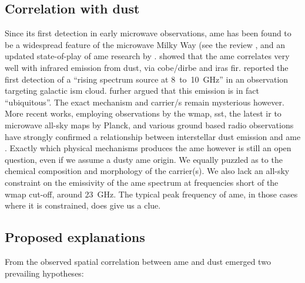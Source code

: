     \subsection{Correlation with dust}
           Since its first detection in early microwave observations, \gls{ame} has been found to be a widespread feature of the microwave Milky Way (see the review \cite{dickinson13r}, and an updated state-of-play of \gls{ame} research by \cite{dickinson18}. \cite{kogut96,deoliveiracosta97} showed that the \gls{ame} correlates very well with infrared emission from dust, via \gls{cobe}/\gls{dirbe} and \gls{iras} \gls{fir}.  \cite{finkbeiner02} reported the first detection of a ``rising spectrum source at 8~to~10~GHz'' in an observation targeting galactic \gls{ism} cloud. \cite{deoliveiracosta02} furher argued that this emission is in fact ``ubiquitous''. The exact mechanism and carrier/s remain mysterious however.
        More recent works, employing observations by the \gls{wmap}, \gls{sst}, the latest \gls{ir} to microwave all-sky maps by Planck, and various ground based radio observations have strongly confirmed a relationship between interstellar dust emission and \gls{ame} \citep{ysard10a,tibbs11,hensley16}. Exactly which physical mechanisms produces the \gls{ame} however is still an open question, even if we assume a dusty \gls{ame} origin. We equally puzzled as to the chemical composition and morphology of the carrier(s). We also lack an all-sky constraint on the emissivity of the \gls{ame} spectrum at frequencies short of the \gls{wmap} cut-off, around 23~GHz. The typical peak frequency of \gls{ame}, in those cases where it is constrained, does give us a clue.

  \subsection{Proposed explanations}
     From the observed spatial correlation between \gls{ame} and dust emerged two prevailing hypotheses:

